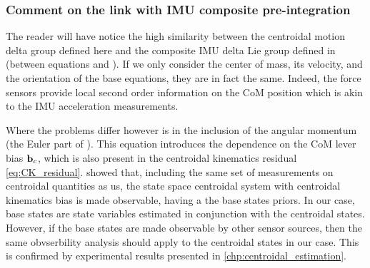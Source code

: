 \subsubsection{Comment on the link with IMU composite pre-integration}
The reader will have notice the high similarity between the centroidal motion delta group defined here and the composite IMU delta Lie group defined 
in  (\eg between equations  and ). If we only consider the center of mass, 
its velocity, and the orientation of the base equations, they are in fact the same. 
Indeed, the force sensors provide local second order information on the CoM position which is akin to the IMU acceleration measurements. 

Where the problems differ however is in the inclusion of the angular momentum (the Euler part of ). This equation introduces the dependence on 
the CoM lever bias ${\bf b}_c$, which is also present in the centroidal kinematics residual \eqref{eq:CK_residual}. \cite{rotella2015humanoid} showed that, including the same set of measurements on centroidal quantities as
us, the state space centroidal system with centroidal kinematics bias is made observable, having a the base states priors. In our case, base states are
state variables estimated in conjunction with the centroidal states. However, if the base states are made observable by other sensor sources, then the same obvserbility analysis
should apply to the centroidal states in our case. This is confirmed by experimental results presented in \ref{chp:centroidal_estimation}.

